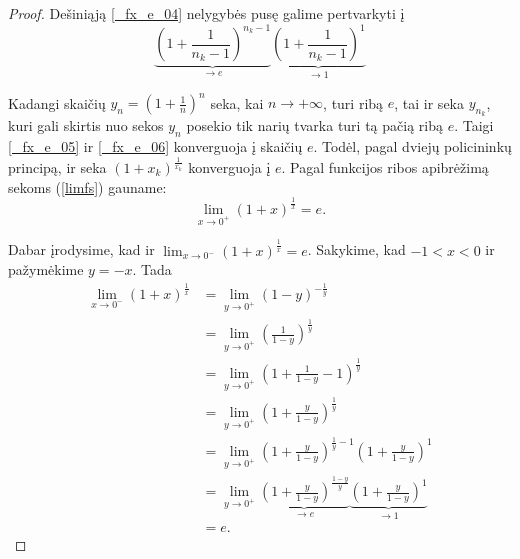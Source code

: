 \begin{exmp}
\begin{proof}
    Dešiniąją \ref{_fx_e_04} nelygybės pusę galime pertvarkyti į
    \begin{equation}
      \underbrace{\left( 1 + \frac{1}{n_{k}-1} \right)^{n_{k}-1}}_{\to e}
      \underbrace{\left( 1 + \frac{1}{n_{k}-1} \right)^{1}}_{\to 1}
      \label{_fx_e_06}
    \end{equation}

    Kadangi skaičių $y_{n} = (1 + \frac{1}{n})^n$ seka, kai 
    $n \to +\infty$, turi ribą $e$, tai ir seka $y_{n_{k}}$, kuri
    gali skirtis nuo sekos $y_{n}$ posekio tik narių tvarka turi 
    tą pačią ribą $e$. Taigi \ref{_fx_e_05} ir \ref{_fx_e_06} 
    konverguoja į skaičių $e$. Todėl, pagal dviejų policininkų
    principą, ir seka $(1 + x_{k})^{\frac{1}{x_{k}}}$ konverguoja į
    $e$. Pagal funkcijos ribos apibrėžimą sekoms (\ref{limfs})
    gauname:
    \begin{equation}
      \lim _{x \to 0^{+}} (1 + x)^{\frac{1}{x}} = e.
      \label{_fx_e_07}
    \end{equation}

    Dabar įrodysime, kad ir 
    $\lim _{x \to 0^{-}} (1 + x)^{\frac{1}{x}} = e$. Sakykime, kad
    $-1 < x < 0$ ir pažymėkime $y = -x$. Tada
    \begin{align*}
      \lim _{x \to 0^{-}} (1 + x)^{\frac{1}{x}} 
      &= \lim _{y \to 0^{+}} (1 - y)^{-\frac{1}{y}} \\
      &= \lim _{y \to 0^{+}} 
        \left( \frac{1}{1 - y} \right)^{\frac{1}{y}} \\
      &= \lim _{y \to 0^{+}} 
        \left( 1 + \frac{1}{1 - y} - 1 \right)^{\frac{1}{y}} \\
      &= \lim _{y \to 0^{+}} 
        \left( 1 + \frac{y}{1 - y} \right)^{\frac{1}{y}} \\
      &= \lim _{y \to 0^{+}} 
        \left( 1 + \frac{y}{1 - y} \right)^{\frac{1}{y} - 1}
        \left( 1 + \frac{y}{1 - y} \right)^{1} \\
      &= \lim _{y \to 0^{+}} 
        \underbrace{
          \left( 1 + \frac{y}{1 - y} \right)^{\frac{1 - y}{y}}}_{\to e}
        \underbrace{
          \left( 1 + \frac{y}{1 - y} \right)^{1}}_{\to 1} \\
      &= e.
    \end{align*}

  \end{proof}
\end{exmp}
